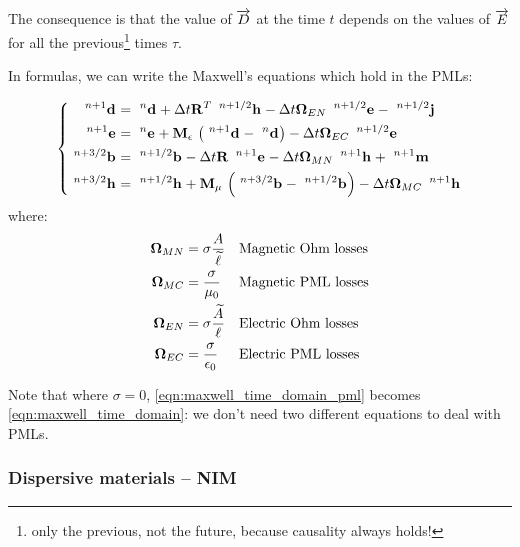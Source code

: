 The consequence is that the value of $\D$ at the time $t$ depends on
the values of $\E$ for all the previous\footnote{only the previous,
  not the future, because causality always holds!} times $\tau$.

In formulas, we can write the Maxwell's equations which hold in the
PMLs:

\begin{equation} \label{eqn:maxwell_time_domain_pml} \left\{ \begin{aligned} 
  \Disc{\Array{d}}{}{n+1} & = \Disc{\Array{d}}{}{n} + \deltat
  \Prod{\Transpose{\Matrix{R}}}{\Disc{\Array{h}}{}{n+1/2}} -
  \deltat \Prod{\Matrix{\Omega}_{EN}}{\Disc{\Array{e}}{}{n+1/2}} -
  \Disc{\Array{j}}{}{n+1/2} \\
  \Disc{\Array{e}}{}{n+1} & = \Disc{\Array{e}}{}{n} +
  \Prod{\Matrix{M}_\epsilon}{\left(\Disc{\Array{d}}{}{n+1} -
  \Disc{\Array{d}}{}{n}\right)} - \deltat
  \Prod{\Matrix{\Omega}_{EC}}{\Disc{\Array{e}}{}{n+1/2}} \\
  \Disc{\Array{b}}{}{n+3/2} & = \Disc{\Array{b}}{}{n+1/2} - \deltat
  \Prod{\Matrix{R}}{\Disc{\Array{e}}{}{n+1}} - \deltat
  \Prod{\Matrix{\Omega}_{MN}}{\Disc{\Array{h}}{}{n+1}} + \Disc{\Array{m}}{}{n+1} \\
  \Disc{\Array{h}}{}{n+3/2} & = \Disc{\Array{h}}{}{n+1/2} +
  \Prod{\Matrix{M}_\mu}{\left(\Disc{\Array{b}}{}{n+3/2} -
  \Disc{\Array{b}}{}{n+1/2} \right)} - \deltat
  \Prod{\Matrix{\Omega}_{MC}}{\Disc{\Array{h}}{}{n+1}}
\end{aligned} \right. \end{equation}
where:
\begin{align*}
  \Matrix{\Omega}_{MN} & = \sigma \frac{A}{\Dual{\ell}} &&
  \text{Magnetic Ohm losses} \\
  \Matrix{\Omega}_{MC} & = \frac{\sigma}{\mu_0}  &&
  \text{Magnetic PML losses} \\
  \Matrix{\Omega}_{EN} & = \sigma \frac{\Dual{A}}{\ell}  &&
  \text{Electric Ohm losses} \\
  \Matrix{\Omega}_{EC} & = \frac{\sigma}{\epsilon_0} &&
  \text{Electric PML losses} 
\end{align*}

Note that where $\sigma = 0$, \eqref{eqn:maxwell_time_domain_pml}
becomes \eqref{eqn:maxwell_time_domain}: we don't need two different
equations to deal with PMLs.


\subsubsection{Dispersive materials -- NIM}

